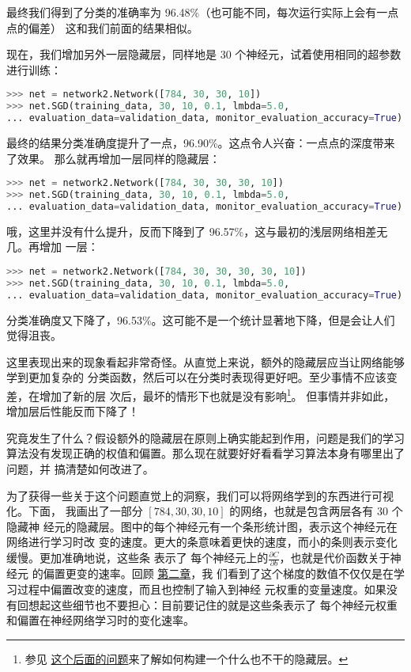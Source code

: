 最终我们得到了分类的准确率为 96.48\%（也可能不同，每次运行实际上会有一点点的偏差）
这和我们前面的结果相似。

现在，我们增加另外一层隐藏层，同样地是 30 个神经元，试着使用相同的超参数进行训练：
\begin{lstlisting}[language=Python]
>>> net = network2.Network([784, 30, 30, 10]) 
>>> net.SGD(training_data, 30, 10, 0.1, lmbda=5.0,  
... evaluation_data=validation_data, monitor_evaluation_accuracy=True) 
\end{lstlisting}

最终的结果分类准确度提升了一点，96.90\%。这点令人兴奋：一点点的深度带来了效果。
那么就再增加一层同样的隐藏层：
\begin{lstlisting}[language=Python]
>>> net = network2.Network([784, 30, 30, 30, 10]) 
>>> net.SGD(training_data, 30, 10, 0.1, lmbda=5.0,  
... evaluation_data=validation_data, monitor_evaluation_accuracy=True) 
\end{lstlisting}

哦，这里并没有什么提升，反而下降到了 96.57\%，这与最初的浅层网络相差无几。再增加
一层：
\begin{lstlisting}[language=Python]
>>> net = network2.Network([784, 30, 30, 30, 30, 10]) 
>>> net.SGD(training_data, 30, 10, 0.1, lmbda=5.0,  
... evaluation_data=validation_data, monitor_evaluation_accuracy=True) 
\end{lstlisting}

分类准确度又下降了，96.53\%。这可能不是一个统计显著地下降，但是会让人们觉得沮丧。
 
这里表现出来的现象看起非常奇怪。从直觉上来说，额外的隐藏层应当让网络能够学到更加复杂的
分类函数，然后可以在分类时表现得更好吧。至少事情不应该变差，在增加了新的层
次后，最坏的情形下也就是没有影响\footnote{参见%
\hyperref[identity_neuron]{这个后面的问题}来了解如何构建一个什么也不干的隐藏层。}。
但事情并非如此，增加层后性能反而下降了！
 
究竟发生了什么？假设额外的隐藏层在原则上确实能起到作用，问题是我们的学习
算法没有发现正确的权值和偏置。那么现在就要好好看看学习算法本身有哪里出了问题，并
搞清楚如何改进了。
 
为了获得一些关于这个问题直觉上的洞察，我们可以将网络学到的东西进行可视化。下面，
我画出了一部分 $[784, 30, 30, 10]$ 的网络，也就是包含两层各有 $30$ 个隐藏神
经元的隐藏层。图中的每个神经元有一个条形统计图，表示这个神经元在网络进行学习时改
变的速度。更大的条意味着更快的速度，而小的条则表示变化缓慢。更加准确地说，这些条
表示了 每个神经元上的$\frac{\partial C}{\partial b}$，也就是代价函数关于神经元
的偏置更变的速率。回顾%
\hyperref[sec:the_four_fundamental_equations_behind_backpropagation]{第二章}，我
们看到了这个梯度的数值不仅仅是在学习过程中偏置改变的速度，而且也控制了输入到神经
元权重的变量速度。如果没有回想起这些细节也不要担心：目前要记住的就是这些条表示了
每个神经元权重和偏置在神经网络学习时的变化速率。
 
